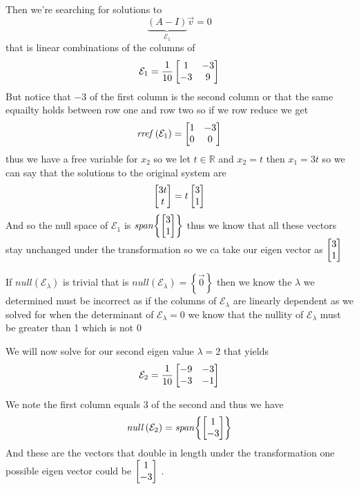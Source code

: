 \documentclass[11pt]{book}
\begin{document}
\begin{eg}
\begin{align*}
    \end{align*}
    Then we're searching for solutions to 
    \[
        \underbrace{\left( A - I \right)}_{\mathcal{E} _{1} }  \vec{v} = 0
    \]
    that is linear combinations of the columns of 
    \[
    \mathcal{E} _{1} = \frac{1}{10}\mat[b]{ 1 & -3 \\ -3 & 9 }
    \]
    But notice that $-3$ of the first column is the second column or that the same equailty holds between row one and row two so if we row reduce we get
    \[
    \mathit{rref} \left(\mathcal{E} _{1} \right) = \mat[b]{ 1 & -3 \\ 0 & 0 }
    \]
    thus we have a free variable for $x_2$ so we let $t \in \mathbb{R} $ and $x_2 = t$ then $x_1 = 3t $ so we can say that the solutions to the original system are
    \[
    \mat{ 3t \\ t } = t\mat{ 3 \\ 1 } 
    \]
    And so the null space of $\mathcal{E} _{1} $ is $\mathit{span} {\left\{ \mat{ 3 \\ 1 }  \right\} } $ thus we know that all these vectors stay unchanged under the transformation so we ca take our eigen vector as $\mat{ 3 \\ 1 } $  
\end{eg}

\begin{remark}
    If $\mathit{null} \left(\mathcal{E} _{\lambda } \right) $ is trivial that is $\mathit{null} \left(\mathcal{E} _{\lambda } \right) = \left\{ \vec{0}  \right\} $ then we know the $\lambda $ we determined must be incorrect as if the columns of $\mathcal{E} _{\lambda } $ are linearly dependent as we solved for when the determinant of $\mathcal{E} _{\lambda } = 0$ we know that the nullity of $\mathcal{E} _{\lambda } $ must be greater than 1 which is not 0
\end{remark}

We will now solve for our second eigen value $\lambda = 2$ that yields 
\[
\mathcal{E} _{2} = \frac{1}{10}\mat[b]{ -9 & -3 \\ -3 & -1 }
\]

We note the first column equals 3 of the second and thus we have 
\[
\mathit{null} \left(\mathcal{E} _{2} \right) = \mathit{span} {\left\{ \mat{ 1 \\ -3 }  \right\} } 
\]
And these are the vectors that double in length under the transformation one possible eigen vector could be $\mat{ 1 \\ -3 } $    .


\end{document}
